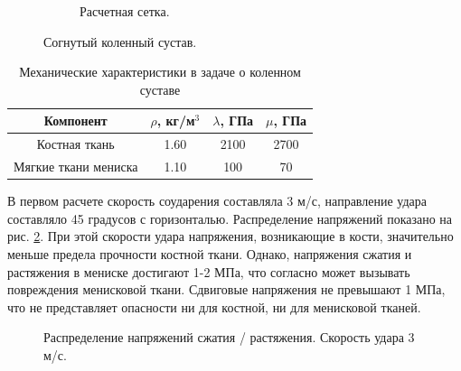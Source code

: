\begin{figure}[h]
\begin{subfigure}[b]{0.4\textwidth}
\caption{Расчетная сетка.}
\end{subfigure}
\caption{Согнутый коленный сустав.}
\label{pic:knee_model}
\end{figure}

\begin{table}[h]
\centering
\caption{Механические характеристики в задаче о коленном суставе}
\begin{tabular}{|c|c|c|c|}
\hline
Компонент & $\rho$, кг/м$^{3}$ & $\lambda$, ГПа & $\mu$, ГПа  \\
\hline
Костная ткань & 1.60 & 2100 & 2700 \\
Мягкие ткани мениска & 1.10 & 100 & 70 \\
\hline
\end{tabular}
\label{tbl:knee_elastic_parameters}
\end{table}

\clearpage
\newpage

В первом расчете скорость соударения составляла 3 м/с, направление удара составляло 45 градусов с горизонталью. Распределение напряжений показано на рис. \ref{pic:knee_res_1}. При этой скорости удара напряжения, возникающие в кости, значительно меньше предела прочности костной ткани. Однако, напряжения сжатия и растяжения в мениске достигают 1-2 МПа, что согласно \cite{dlima} может вызывать повреждения менисковой ткани. Сдвиговые напряжения не превышают 1 МПа, что не представляет опасности ни для костной, ни для менисковой тканей.

\begin{figure}[H]
\caption{Распределение напряжений сжатия / растяжения. Скорость удара 3 м/с.}
\label{pic:knee_res_1}
\end{figure}

